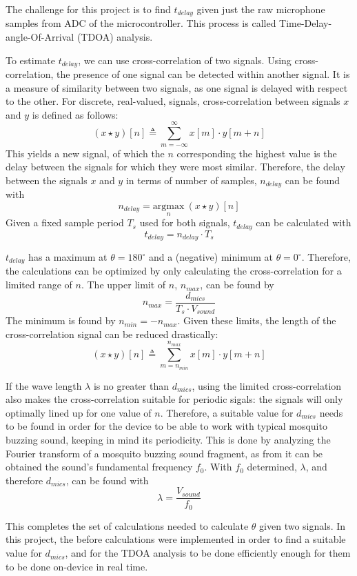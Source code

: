\documentclass[a4paper]{article}
\begin{document}
The challenge for this project is to find $t_{delay}$ given just the raw microphone samples from ADC of the microcontroller. This process is called Time-Delay-angle-Of-Arrival (TDOA) analysis.

To estimate $t_{delay}$, we can use cross-correlation of two signals. Using cross-correlation, the presence of one signal can be detected within another signal. It is a measure of similarity between two signals, as one signal is delayed with respect to the other. For discrete, real-valued, signals, cross-correlation between signals $x$ and $y$ is defined as follows: \[(x \star y)[n] \triangleq \sum_{m = -\infty}^ {\infty} x[m]\cdot y[m + n]\] This yields a new signal, of which the $n$ corresponding the highest value is the delay between the signals for which they were most similar. Therefore, the delay between the signals $x$ and $y$ in terms of number of samples, $n_{delay}$ can be found with \[n_{delay} = \underset{n}{\mathrm{argmax}}\ (x \star y)[n]\] Given a fixed sample period $T_s$ used for both signals, $t_{delay}$ can be calculated with \[t_{delay} = n_{delay} \cdot T_s\]

$t_{delay}$ has a maximum at $\theta = 180^{\circ}$ and a (negative) minimum at $\theta = 0^{\circ}$. Therefore, the calculations can be optimized by only calculating the cross-correlation for a limited range of $n$. The upper limit of $n$, $n_{max}$, can be found by \[n_{max} = \frac{d_{mics}}{T_s \cdot V_{sound}}\] The minimum is found by $n_{min} = -n_{max}$. Given these limits, the length of the cross-correlation signal can be reduced drastically:\[(x \star y)[n] \triangleq \sum_{m = n_{min}}^ {n_{max}} x[m]\cdot y[m + n]\]

If the wave length $\lambda$ is no greater than $d_{mics}$, using the limited cross-correlation also makes the cross-correlation suitable for periodic sigals: the signals will only optimally lined up for one value of $n$. Therefore, a suitable value for $d_{mics}$ needs to be found in order for the device to be able to work with typical mosquito buzzing sound, keeping in mind its periodicity. This is done by analyzing the Fourier transform of a mosquito buzzing sound fragment\cite{mosquito_fragment}, as from it can be obtained the sound's fundamental frequency $f_0$. With $f_0$ determined, $\lambda$, and therefore $d_{mics}$, can be found with \[\lambda = \frac{V_{sound}}{f_0}\]

This completes the set of calculations needed to calculate $\theta$ given two signals. In this project, the before calculations were implemented in order to find a suitable value for $d_{mics}$, and for the TDOA analysis to be done efficiently enough for them to be done on-device in real time.
\end{document}
